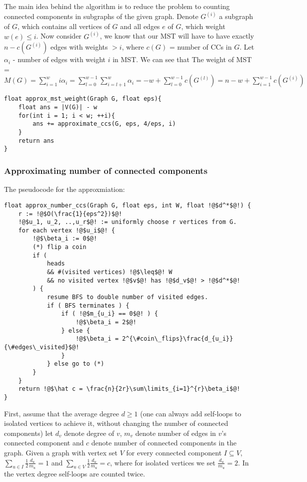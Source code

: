 \documentclass{article}
\begin{document}
The main idea behind the algorithm is to reduce the problem to counting connected components in subgraphs of the given graph. Denote $G^{(i)}$ a subgraph of $G$, which contains all vertices of $G$ and all edges $e$ of $G$, which weight $w(e) \leq i$. Now consider $G^{(i)}$, we know that our MST will have to have exactly $n - c(G^{(i)})$ edges with weights $> i$, where $c(G)$ = number of CCs in $G$. Let $\alpha_{i}$ - number of edges with weight $i$ in MST. We can see that The weight of MST = $M(G) = \sum\limits_{i = 1}^{w}i\alpha_{i} = \sum\limits_{l=0}^{w-1}\sum\limits_{i = l + 1}^{w}\alpha_{i}=-w + \sum\limits_{l=0}^{w-1}c(G^{(l)}) = n - w + \sum\limits_{i=1}^{w-1}c(G^{(i)})$ 

\newpage
\begin{lstlisting}
float approx_mst_weight(Graph G, float eps){
    float ans = |V(G)| - w
    for(int i = 1; i < w; ++i){
        ans += approximate_ccs(G, eps, 4/eps, i)
    }
    return ans
}
\end{lstlisting}

\subsubsection{Approximating number of connected components}
The pseudocode for the approxmiation:
\begin{lstlisting}
float approx_number_ccs(Graph G, float eps, int W, float !@$d^*$@!) {
    r := !@$O(\frac{1}{eps^2})$@!
    !@$u_1, u_2, ..,u_r$@! := uniformly choose r vertices from G.
    for each vertex !@$u_i$@! {
        !@$\beta_i := 0$@!
        (*) flip a coin
        if (
            heads 
            && #(visited vertices) !@$\leq$@! W 
            && no visited vertex !@$v$@! has !@$d_v$@! > !@$d^*$@!
        ) {
            resume BFS to double number of visited edges.
            if ( BFS terminates ) {
                if ( !@$m_{u_i} == 0$@! ) {
                    !@$\beta_i = 2$@!
                } else {
                    !@$\beta_i = 2^{\#coin\_flips}\frac{d_{u_i}}{\#edges\_visited}$@!
                }
            } else go to (*)
        }
    }
    return !@$\hat c = \frac{n}{2r}\sum\limits_{i=1}^{r}\beta_i$@!
}
\end{lstlisting}

First, assume that the average degree $d \geq 1$ (one can always add self-loops to isolated vertices to achieve it, without changing the number of connected components)
let $d_v$ denote degree of $v$, $m_v$ denote number of edges in $v$'s connected component and $c$ denote number of connected components in the graph. 
Given a graph with vertex set $V$ for every connected component $I \subseteq V$,
$\sum\limits_{u \in I}\frac{1}{2}\frac{d_u}{m_u} = 1$ and $\sum\limits_{u \in V}\frac{1}{2}\frac{d_u}{m_u} = c$, where for isolated vertices we set $\frac{d_u}{m_u} = 2$.
In the vertex degree self-loops are counted twice.
\end{document}
